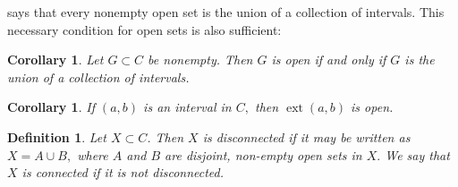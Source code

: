 \documentclass{amsart}
\newtheorem{definition}[theorem]{Definition}
\newtheorem{corollary}[theorem]{Corollary}
\newtheorem{exercise}[theorem]{Exercise}
\newcommand{\1}{\mathds{1}}
\DeclareMathOperator{\ext}{ext}
\numberwithin{equation}{section}
\numberwithin{theorem}{section}
\begin{document}
 says that every nonempty open set is the union of a collection of intervals.  This necessary condition for open sets is also sufficient:


 \begin{corollary}
 Let $G \subset C$ be nonempty.  Then $G$ is open if and only if $G$ is the union of a collection of intervals.
\end{corollary}

\begin{corollary} If $(a, b)$ is an interval in $C,$ then $\ext(a,b)$ is open.
\end{corollary} 


%
%
%
%
%
%
%
%
%


\begin{definition}
Let $X\subset C$. Then $X$ is {\it disconnected} if it may be written as $X=A\cup B,$ where $A$ and $B$ are disjoint, non-empty open sets in $X.$  We say that $X$ is {\it connected} if it is not disconnected.
\end{definition} 
\end{document}
